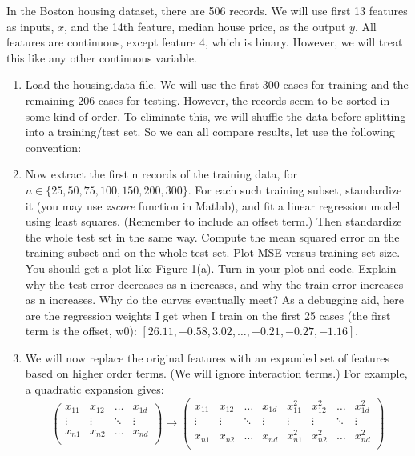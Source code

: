 \documentclass[11pt]{article}
\newcommand{\mfile}[1]  {{\small }} %
\begin{document}
In the Boston housing dataset, there are 506 records. We will
use first 13 features as inputs, $x$, and the 14th feature, median house price, as the output $y$. All features are continuous,
except feature 4, which is binary. However, we will treat this like any other continuous variable.
\begin{enumerate}
	\item Load the housing.data file. We will use the first 300 cases for training and the remaining 206 cases for
	testing. However, the records seem to be sorted in some kind of order. To eliminate this, we will shuffle the data
	before splitting into a training/test set. So we can all compare results, let use the following convention:
	\mfile{sample.m}
	\item Now extract the first n records of the training data, for $n \in \{25, 50, 75, 100, 150, 200, 300\}$. For each such
	training subset, standardize it (you may use \textit{zscore} function in Matlab), and fit a linear regression model using least squares. (Remember to include
	an offset term.) Then standardize the whole test set in the same way. Compute the mean squared error on
	the training subset and on the whole test set. Plot MSE versus training set size. You should get a plot like
	Figure 1(a). Turn in your plot and code. Explain why the test error decreases as n increases, and why the train
	error increases as n increases. Why do the curves eventually meet?
	As a debugging aid, here are the regression weights I get when I train on the first 25 cases (the first term is the
	offset, w0): $[26.11, -0.58, 3.02,\dots,-0.21, -0.27, -1.16]$.
	\item We will now replace the original features with an expanded set of features based on higher order terms. (We
	will ignore interaction terms.) For example, a quadratic expansion gives:
	\begin{equation}
		\begin{pmatrix}
			x_{11} & x_{12} & \dots & x_{1d} \\
			\vdots& \vdots & \ddots & \vdots \\
			x_{n1}& x_{n2} & \dots & x_{nd} \\
		\end{pmatrix}\xrightarrow[]{}\begin{pmatrix}
			x_{11} & x_{12} & \dots & x_{1d}& x_{11}^2 & x_{12}^2 & \dots & x_{1d}^2\\
			\vdots& \vdots & \ddots & \vdots&\vdots& \vdots & \ddots & \vdots \\
			x_{n1}& x_{n2} & \dots & x_{nd}& x_{n1}^2& x_{n2}^2 & \dots & x_{nd}^2\\

\end{pmatrix}
\end{equation}
\end{enumerate}
\end{document}
